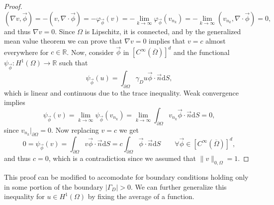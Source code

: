 \begin{lemma}
\begin{proof}
        \begin{equation*}
            (\nabla v,\vec\phi) = -(v,\nabla\cdot\vec\phi) = -\varphi_{\vec{\phi}}(v) = -\lim_{k\to\infty} \varphi_{\vec{\phi}}(v_{n_k}) = -\lim_{k\to\infty} (v_{n_k},\nabla\cdot\vec\phi) = 0,
        \end{equation*}
        and thus $\nabla v = 0$. Since $\Omega$ is Lipschitz, it is connected, and by the generalized mean value theorem we can prove that $\nabla v = 0$ implies that $v=c$ almost everywhere for $c\in \mathbb{R}$. Now, consider $\vec\phi$ in $[C^\infty(\overline{\Omega})]^d$ and the functional $\psi_{\vec{\phi}}:H^1(\Omega)\to \mathbb{R}$ such that 
        \begin{equation*}
            \psi_{\vec{\phi}}(u) = \int_{\partial\Omega} \gamma_D u \vec\phi\cdot\vec n \mathrm{d}S,
            \end{equation*}
        which is linear and continuous due to the trace inequality. Weak convergence implies
        \begin{equation*}
            \psi_{\vec{\phi}}(v) = \lim_{k\to\infty} \psi_{\vec{\phi}}(v_{n_k}) = \lim_{k\to\infty} \int_{\partial\Omega} v_{n_k} \vec\phi\cdot\vec n \mathrm{d}S = 0,
        \end{equation*}
        since  $v_{n_k}|_{\partial\Omega} = 0$. Now replacing $v=c$ we get
        \begin{equation*}
            0 = \psi_{\vec{\phi}}(v) = \int_{\partial\Omega} v\vec\phi \cdot\vec n\mathrm{d}S = c\int_{\partial\Omega} \vec\phi\cdot\vec n \mathrm{d}S \qquad \forall \vec\phi \in [C^\infty(\overline\Omega)]^d,
        \end{equation*}
        and thus $c=0$, which is a contradiction since we assumed that $\|v\|_{0,\Omega}=1$. 
    \end{proof}
\end{lemma}

This proof can be modified to accomodate for boundary conditions holding only in some portion of the boundary $|\Gamma_D|>0$. We can further generalize this inequality for $u\in H^1(\Omega)$ by fixing the average of a function. 

